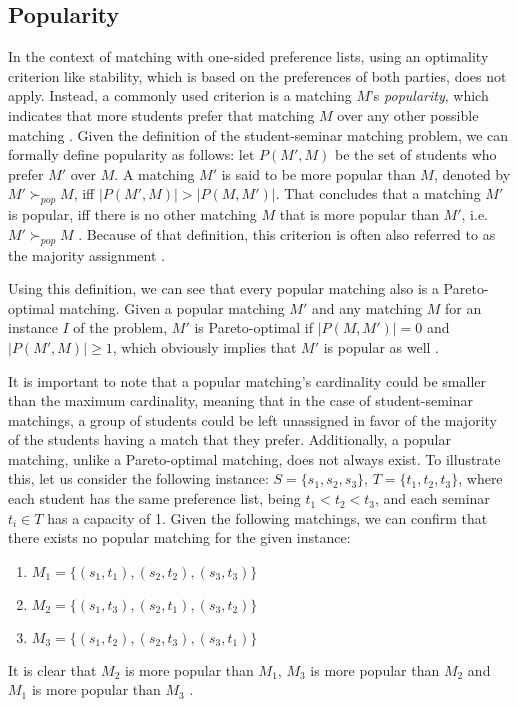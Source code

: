 \subsection{Popularity}
In the context of matching with one-sided preference lists, using an optimality criterion like stability, which is based on the preferences of both parties, does not apply. Instead, a commonly used criterion is a matching $M$'s \emph{popularity}, which indicates that more students prefer that matching $M$ over any other possible matching \cite{ManlovePopularMatchings}. Given the definition of the student-seminar matching problem, we can formally define popularity as follows:
let $P(M', M)$ be the set of students who prefer $M'$ over $M$. A matching $M'$ is said to be more popular than $M$, denoted by $M' \succ_{pop} M$, iff $|P(M', M)| > |P(M, M')|$. That concludes that a matching $M'$ is popular, iff there is no other matching $M$ that is more popular than $M'$, i.e. $M' \succ_{pop} M$ \cite{Klaus, AbrahamPopular}. Because of that definition, this criterion is often also referred to as the majority assignment \cite{Gardenfors}.

Using this definition, we can see that every popular matching also is a Pareto-optimal matching. Given a popular matching $M'$ and any matching $M$ for an instance $I$ of the problem, $M'$ is Pareto-optimal if $|P(M, M')| = 0$ and $|P(M', M)| \geq 1$, which obviously implies that $M'$ is popular as well \cite{Klaus}.

It is important to note that a popular matching's cardinality could be smaller than the maximum cardinality, meaning that in the case of student-seminar matchings, a group of students could be left unassigned in favor of the majority of the students having a match that they prefer.
Additionally, a popular matching, unlike a Pareto-optimal matching, does not always exist. To illustrate this, let us consider the following instance: $S=\{s_1, s_2, s_3\}$, $T=\{t_1, t_2, t_3\}$, where each student has the same preference list, being $t_1 < t_2 < t_3$, and each seminar $t_i \in T$ has a capacity of 1. Given the following matchings, we can confirm that there exists no popular matching for the given instance: 
\begin{enumerate}
    \item $M_1=\{(s_1, t_1), (s_2, t_2), (s_3, t_3)\}$
    \item $M_2=\{(s_1, t_3), (s_2, t_1), (s_3, t_2)\}$
    \item $M_3=\{(s_1, t_2), (s_2, t_3), (s_3, t_1)\}$
\end{enumerate}
It is clear that $M_2$ is more popular than $M_1$, $M_3$ is more popular than $M_2$ and $M_1$ is more popular than $M_3$ \cite{AbrahamPopular}.

